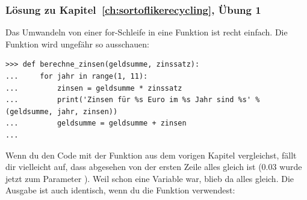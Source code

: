 \subsubsection{Lösung zu Kapitel~\ref{ch:sortoflikerecycling}, Übung 1}
Das Umwandeln von einer for-Schleife in eine Funktion ist recht einfach. Die Funktion wird ungefähr so ausschauen:

\begin{Verbatim}[frame=single]
>>> def berechne_zinsen(geldsumme, zinssatz):
...     for jahr in range(1, 11):
...         zinsen = geldsumme * zinssatz
...         print('Zinsen für %s Euro im %s Jahr sind %s' % (geldsumme, jahr, zinsen))
...         geldsumme = geldsumme + zinsen
...
\end{Verbatim}

Wenn du den Code mit der Funktion aus dem vorigen Kapitel vergleichst, fällt dir vielleicht auf, dass abgesehen von der ersten Zeile alles gleich ist (0.03 wurde jetzt zum Parameter ). Weil  schon eine Variable war, blieb da alles gleich. Die Ausgabe ist auch identisch, wenn du die Funktion verwendest:

